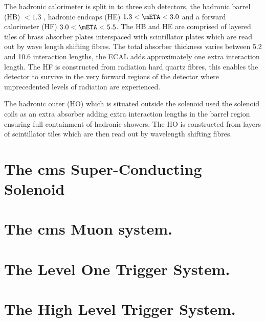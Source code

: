 The hadronic calorimeter is split in to three sub detectors, the hadronic 
barrel (HB) \mETA $< 1.3$ , hadronic endcaps (HE) $1.3 < \mETA < 3.0$ and a 
forward calorimeter (HF) $3.0 < \mETA < 5.5$.
The HB and HE are comprised of layered tiles of brass absorber plates 
interspaced with scintillator plates which are read out by wave length shifting 
fibres. The total absorber thickness varies between 5.2 and 10.6 interaction 
lengths, the ECAL adds approximately one extra interaction length.
The HF is constructed from radiation hard quartz fibres, this enables the 
detector to survive in the very forward regions of the detector where 
unprecedented levels of radiation are experienced.

The hadronic outer (HO) which is situated outside the solenoid used the 
solenoid coils as an extra absorber adding extra interaction lengths in the 
barrel region ensuring full containment of hadronic showers. The HO is 
constructed from layers of scintillator tiles which are then read out by 
wavelength shifting fibres.


\section{The \ac{cms} Super-Conducting Solenoid} %
\label{sec:the_cms_super_conducting_solenoid}


\section{The \ac{cms} Muon system.} %
\label{sec:the_cms_muon_system}


\section{The Level One Trigger System.} %
\label{sec:the_level_one_trigger_system}


\section{The High Level Trigger System.} %
\label{sec:the_high_level_trigger_system}


